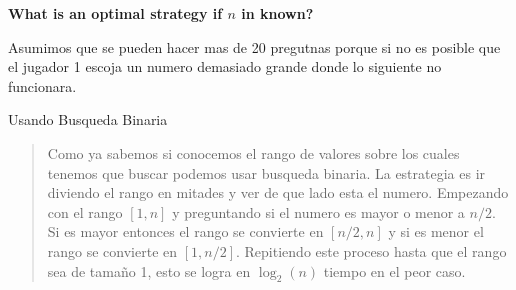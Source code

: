 \textbf{What is an optimal strategy if $n$ in known?}\vspace{.2cm}

Asumimos que se pueden hacer mas de 20 pregutnas porque si no es posible que el jugador 1 escoja un numero demasiado grande donde lo siguiente no funcionara. \vspace{.2cm}

\textcolor{bibi}{Usando Busqueda Binaria}
\begin{quote}
    Como ya sabemos si conocemos el rango de valores sobre los cuales tenemos que buscar podemos usar busqueda binaria. La estrategia es ir diviendo el rango en mitades y ver de que lado esta el numero. Empezando con el rango $[1, n]$ y preguntando si el numero es mayor o menor a $n/2$. Si es mayor entonces el rango se convierte en $[n/2, n]$ y si es menor el rango se convierte en $[1, n/2]$. Repitiendo este proceso hasta que el rango sea de tamaño 1, esto se logra en $\log_2(n)$ tiempo en el peor caso. \vspace{.2cm}
\end{quote}